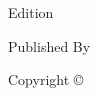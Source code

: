 \setcounter{page}{-1}

\fullpageimage{\coverimage}

\thispagestyle{empty}

\frontmatter
\makeatletter
\begin{titlepage}
    \thispagestyle{empty}
    \begin{center}
        \LARGE
        \@title%
        
        \vspace*{1.5in}
        \Large
        {\bookedition} Edition
        
        \vspace*{1.5in}
        \Large
        \@author%
        
        \vspace*{\fill}
    \end{center}
    \newpage
    \thispagestyle{empty}
    \begin{center}
        \vspace*{\fill}
        Published By
        
        \publisher%
        
        Copyright \copyright\; \@date%

    \end{center}
\makeatother
\end{titlepage}

\thispagestyle{empty}
\tableofcontents
\thispagestyle{empty}

